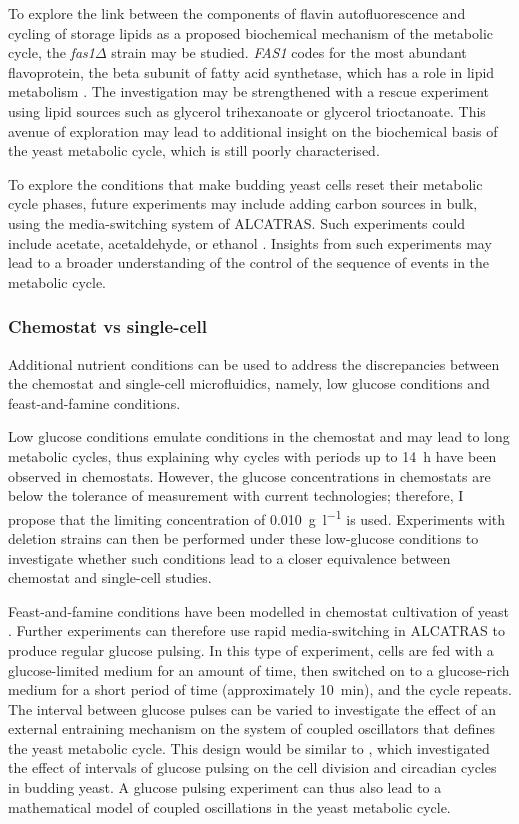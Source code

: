 To explore the link between the components of flavin autofluorescence and cycling of storage lipids as a proposed biochemical mechanism of the metabolic cycle, the \textit{fas1$\Delta$} strain may be studied.
\textit{FAS1} codes for the most abundant flavoprotein, the beta subunit of fatty acid synthetase, which has a role in lipid metabolism \parencite{gudipatiFlavoproteomeYeastSaccharomyces2014}.
The investigation may be strengthened with a rescue experiment using lipid sources such as glycerol trihexanoate or glycerol trioctanoate.
This avenue of exploration may lead to additional insight on the biochemical basis of the yeast metabolic cycle, which is still poorly characterised.

To explore the conditions that make budding yeast cells reset their metabolic cycle phases, future experiments may include adding carbon sources in bulk, using the media-switching system of ALCATRAS\@.
Such experiments could include acetate, acetaldehyde, or ethanol \parencite{kuangMsn2RegulateExpression2017, krishnaMinimalPushPull2018}.
Insights from such experiments may lead to a broader understanding of the control of the sequence of events in the metabolic cycle.


\subsubsection{Chemostat vs single-cell}
\label{subsec:biology-discussion-caveats-chemostat}

Additional nutrient conditions can be used to address the discrepancies between the chemostat and single-cell microfluidics, namely, low glucose conditions and feast-and-famine conditions.

Low glucose conditions emulate conditions in the chemostat and may lead to long metabolic cycles, thus explaining why cycles with periods up to \SI{14}{\hour} have been observed in chemostats.
However, the glucose concentrations in chemostats are below the tolerance of measurement with current technologies; therefore, I propose that the limiting concentration of \SI{0.010}{\gram~\litre^{-1}} is used.
Experiments with deletion strains can then be performed under these low-glucose conditions to investigate whether such conditions lead to a closer equivalence between chemostat and single-cell studies.

Feast-and-famine conditions have been modelled in chemostat cultivation of yeast \parencite{jonesCyberneticModelGrowth1999}.
Further experiments can therefore use rapid media-switching in ALCATRAS to produce regular glucose pulsing.
In this type of experiment, cells are fed with a glucose-limited medium for an amount of time, then switched on to a glucose-rich medium for a short period of time (approximately \SI{10}{\minute}), and the cycle repeats.
The interval between glucose pulses can be varied to investigate the effect of an external entraining mechanism on the system of coupled oscillators that defines the yeast metabolic cycle.
This design would be similar to \textcite{charvinForcedPeriodicExpression2009}, which investigated the effect of intervals of glucose pulsing on the cell division and circadian cycles in budding yeast.
A glucose pulsing experiment can thus also lead to a mathematical model of coupled oscillations in the yeast metabolic cycle.
